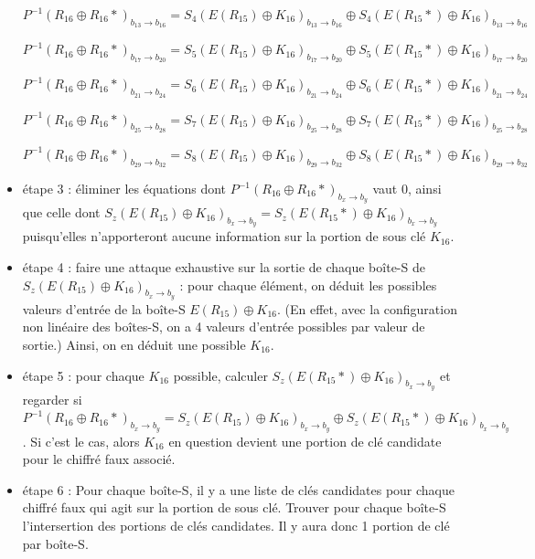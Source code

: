 \documentclass[11pt]{article}
\begin{document}
\begin{itemize}
	$P^{-1}(R_{16}\oplus R_{16}*)_{b_{13}\to b_{16}} = S_4(E(R_{15})\oplus K_{16})_{b_{13}\to b_{16}} \oplus S_4(E(R_{15}*)\oplus K_{16})_{b_{13}\to b_{16}}$
			
	$P^{-1}(R_{16}\oplus R_{16}*)_{b_{17}\to b_{20}} = S_5(E(R_{15})\oplus K_{16})_{b_{17}\to b_{20}} \oplus S_5(E(R_{15}*)\oplus K_{16})_{b_{17}\to b_{20}}$
				
	$P^{-1}(R_{16}\oplus R_{16}*)_{b_{21}\to b_{24}} = S_6(E(R_{15})\oplus K_{16})_{b_{21}\to b_{24}} \oplus S_6(E(R_{15}*)\oplus K_{16})_{b_{21}\to b_{24}}$
					
	$P^{-1}(R_{16}\oplus R_{16}*)_{b_{25}\to b_{28}} = S_7(E(R_{15})\oplus K_{16})_{b_{25}\to b_{28}} \oplus S_7(E(R_{15}*)\oplus K_{16})_{b_{25}\to b_{28}}$
						
	$P^{-1}(R_{16}\oplus R_{16}*)_{b_{29}\to b_{32}} = S_8(E(R_{15})\oplus K_{16})_{b_{29}\to b_{32}} \oplus S_8(E(R_{15}*)\oplus K_{16})_{b_{29}\to b_{32}}$ \newline
	
	\item étape 3 : éliminer les équations dont $P^{-1}(R_{16}\oplus R_{16}*)_{b_x\to b_y}$ vaut $0$, ainsi que celle dont $S_z(E(R_{15})\oplus K_{16})_{b_{x}\to b_{y}} = S_z(E(R_{15}*)\oplus K_{16})_{b_{x}\to b_{y}}$ puisqu'elles n'apporteront aucune information sur la portion de sous clé $K_{16}$. \newline
	
	\item étape 4 : faire une attaque exhaustive sur la sortie de chaque boîte-S de $S_z(E(R_{15})\oplus K_{16})_{b_{x}\to b_{y}}$ : pour chaque élément, on déduit les possibles valeurs d'entrée de la boîte-S $E(R_{15})\oplus K_{16}$. (En effet, avec la configuration non linéaire des boîtes-S, on a 4 valeurs d'entrée possibles par valeur de sortie.) Ainsi, on en déduit une possible $K_{16}$. \newline
	
	\item étape 5 : pour chaque $K_{16}$ possible, calculer $S_z(E(R_{15}*)\oplus K_{16})_{b_{x}\to b_{y}}$ et regarder si $P^{-1}(R_{16}\oplus R_{16}*)_{b_{x}\to b_{y}} = S_z(E(R_{15})\oplus K_{16})_{b_{x}\to b_{y}} \oplus S_z(E(R_{15}*)\oplus K_{16})_{b_{x}\to b_{y}}$. Si c'est le cas, alors $K_{16}$ en question devient une portion de clé candidate pour le chiffré faux associé. \newline
	
	\item étape 6 : Pour chaque boîte-S, il y a une liste de clés candidates pour chaque chiffré faux qui agit sur la portion de sous clé. Trouver pour chaque boîte-S l'intersertion des portions de clés candidates. Il y aura donc 1 portion de clé par boîte-S. \newline
	

\end{itemize}
\end{document}
